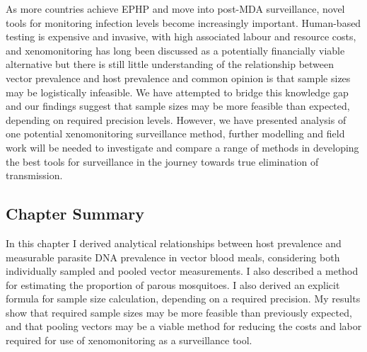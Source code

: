 As more countries achieve EPHP and move into post-MDA surveillance, novel tools for monitoring infection levels become increasingly important. Human-based testing is expensive and invasive, with high associated labour and resource costs, and xenomonitoring has long been discussed as a potentially financially viable alternative but there is still little understanding of the relationship between vector prevalence and host prevalence and common opinion is that sample sizes may be logistically infeasible. We have attempted to bridge this knowledge gap and our findings suggest that sample sizes may be more feasible than expected, depending on required precision levels. However, we have presented analysis of one potential xenomonitoring surveillance method, further modelling and field work will be needed to investigate and compare a range of methods in developing the best tools for surveillance in the journey towards true elimination of transmission.

\subsection{Chapter Summary}

In this chapter I derived analytical relationships between host prevalence and measurable parasite DNA prevalence in vector blood meals, considering both individually sampled and pooled vector measurements. I also described a method for estimating the proportion of parous mosquitoes. I also derived an explicit formula for sample size calculation, depending on a required precision. My results show that required sample sizes may be more feasible than previously expected, and that pooling vectors may be a viable method for reducing the costs and labor required for use of xenomonitoring as a surveillance tool.

\FloatBarrier